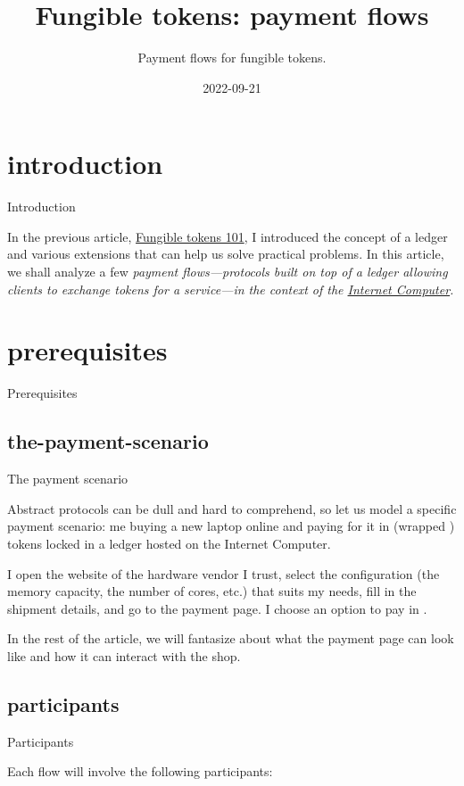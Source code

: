 \documentclass{article}
\title{Fungible tokens: payment flows}
\subtitle{Payment flows for fungible tokens.}
\date{2022-09-21}
\begin{document}
\section{introduction}{Introduction}

In the previous article, \href{/posts/09-fungible-tokens-101.html}{Fungible tokens 101}, I introduced the concept of a ledger and various extensions that can help us solve practical problems.
In this article, we shall analyze a few \em{payment flows}---protocols built on top of a ledger allowing clients to exchange tokens for a service---in the context of the \href{https://internetcomputer.org}{Internet Computer}.

\section{prerequisites}{Prerequisites}
\subsection{the-payment-scenario}{The payment scenario}

Abstract protocols can be dull and hard to comprehend, so let us model a specific payment scenario: me buying a new laptop online and paying for it in  (wrapped \href{https://en.wikipedia.org/wiki/Special_drawing_rights}{}) tokens locked in a ledger hosted on the Internet Computer.

I open the website of the hardware vendor I trust, select the configuration (the memory capacity, the number of cores, etc.) that suits my needs, fill in the shipment details, and go to the payment page.
I choose an option to pay in .

In the rest of the article, we will fantasize about what the payment page can look like and how it can interact with the shop.

\subsection{participants}{Participants}

Each flow will involve the following participants:
\end{document}
